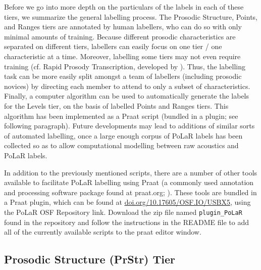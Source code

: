 \documentclass[11pt, twoside]{memoir}
\begin{document}
Before we go into more depth on the particulars of the labels in each of these tiers, we summarize the general labelling process. The Prosodic Structure, Points, and Ranges tiers are annotated by human labellers, who can do so with only minimal amounts of training. Because different prosodic characteristics are separated on different tiers, labellers can easily focus on one tier / one characteristic at a time. Moreover, labelling some tiers may not even require training (cf. Rapid Prosody Transcription, developed by \citealt{cole-14}). Thus, the labelling task can be more easily split amongst a team of labellers (including prosodic novices) by directing each member to attend to only a subset of characteristics. Finally, a computer algorithm can be used to automatically generate the labels for the Levels tier, on the basis of labelled Points and Ranges tiers. This algorithm has been implemented as a Praat script (bundled in a plugin; see following paragraph). Future developments may lead to additions of similar sorts of automated labelling, once a large enough corpus of PoLaR labels has been collected so as to allow computational modelling between raw acoustics and PoLaR labels.

In addition to the previously mentioned scripts, there are a number of other tools available to facilitate PoLaR labelling using Praat (a commonly used annotation and processing software package found at praat.org; \citealt{praat}). These tools are bundled in a Praat plugin, which can be found at \href{https://doi.org/10.17605/OSF.IO/USBX5}{\uline{doi.org/10.17605/OSF.IO/USBX5}}, using the PoLaR OSF Repository link. Download the zip file named \texttt{plugin\_PoLaR} found in the repository and follow the instructions in the README file to add all of the currently available scripts to the praat editor window.

\subsection{Prosodic Structure (PrStr) Tier}\label{sec:prosodic-structure-prstr}
\end{document}
